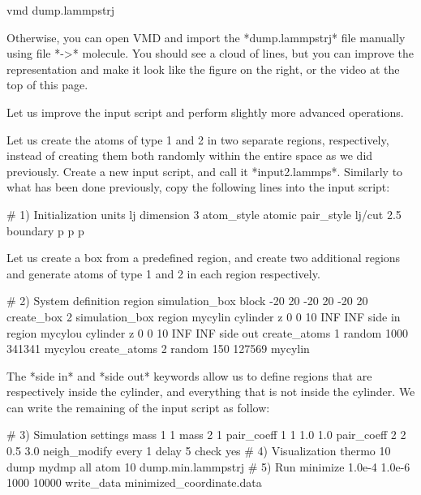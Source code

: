 \begin{lcverbatim}
vmd dump.lammpstrj
\end{lcverbatim}

Otherwise, you can open VMD and import the *dump.lammpstrj*
file manually using file *->* molecule. You should see a cloud
of lines, but you can improve the representation and make it
look like the figure on the right, or the video at the 
top of this page. 






Let us improve the input script and perform slightly more
advanced operations.








Let us create the atoms of type 1 and 2 in two separate
regions, respectively, instead of creating them both randomly 
within the entire space as we did previously. Create a new input script, and call
it *input2.lammps*. Similarly to what has been done previously, copy the following lines
into the input script:



\begin{lcverbatim}
# 1) Initialization
units lj
dimension 3
atom_style atomic
pair_style lj/cut 2.5
boundary p p p
\end{lcverbatim}

Let us create a box from a predefined region,
and create two additional regions and generate
atoms of type 1 and 2 in each region respectively.



\begin{lcverbatim}
# 2) System definition
region simulation_box block -20 20 -20 20 -20 20
create_box 2 simulation_box
region mycylin cylinder z 0 0 10 INF INF side in
region mycylou cylinder z 0 0 10 INF INF side out
create_atoms 1 random 1000 341341 mycylou
create_atoms 2 random 150 127569 mycylin
\end{lcverbatim}

The *side in* and *side out* keywords
allow us to define regions that are respectively inside the
cylinder, and everything that is not inside the cylinder.
We can write the remaining of the input script as follow:



\begin{lcverbatim}
# 3) Simulation settings
mass 1 1
mass 2 1
pair_coeff 1 1 1.0 1.0
pair_coeff 2 2 0.5 3.0
neigh_modify every 1 delay 5 check yes
# 4) Visualization
thermo 10
dump mydmp all atom 10 dump.min.lammpstrj
# 5) Run
minimize 1.0e-4 1.0e-6 1000 10000
write_data minimized_coordinate.data
\end{lcverbatim}

